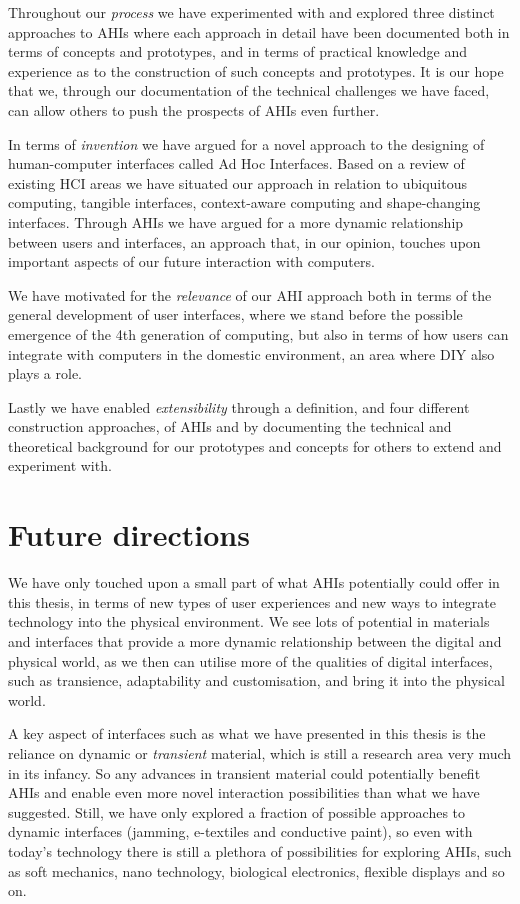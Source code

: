 Throughout our \emph{process} we have experimented with and explored three distinct approaches to AHIs where each approach in detail have been documented both in terms of concepts and prototypes, and in terms of practical knowledge and experience as to the construction of such concepts and prototypes.
It is our hope that we, through our documentation of the technical challenges we have faced, can allow others to push the prospects of AHIs even further.

In terms of \emph{invention} we have argued for a novel approach to the designing of human-computer interfaces called Ad Hoc Interfaces.
Based on a review of existing HCI areas we have situated our approach in relation to ubiquitous computing, tangible interfaces, context-aware computing and shape-changing interfaces.
Through AHIs we have argued for a more dynamic relationship between users and interfaces, an approach that, in our opinion, touches upon important aspects of our future interaction with computers.

We have motivated for the \emph{relevance} of our AHI approach both in terms of the general development of user interfaces, where we stand before the possible emergence of the 4th generation of computing, but also in terms of how users can integrate with computers in the domestic environment, an area where DIY also plays a role.

Lastly we have enabled \emph{extensibility} through a definition, and four different construction approaches, of AHIs and by documenting the technical and theoretical background for our prototypes and concepts for others to extend and experiment with.

\section{Future directions}
We have only touched upon a small part of what AHIs potentially could offer in this thesis, in terms of new types of user experiences and new ways to integrate technology into the physical environment.
We see lots of potential in materials and interfaces that provide a more dynamic relationship between the digital and physical world, as we then can utilise more of the qualities of digital interfaces, such as transience, adaptability and customisation, and bring it into the physical world.

A key aspect of interfaces such as what we have presented in this thesis is the reliance on dynamic or \emph{transient} material, which is still a research area very much in its infancy.
So any advances in transient material could potentially benefit AHIs and enable even more novel interaction possibilities than what we have suggested.
Still, we have only explored a fraction of possible approaches to dynamic interfaces (jamming, e-textiles and conductive paint), so even with today's technology there is still a plethora of possibilities for exploring AHIs, such as soft mechanics, nano technology, biological electronics, flexible displays and so on.

